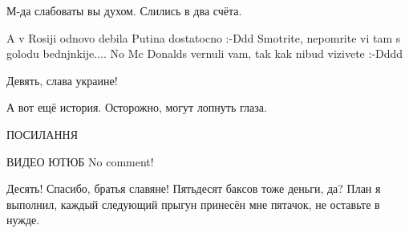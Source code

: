 \begin{itemize}
М-да слабоваты вы духом. Слились в два счёта.


A v Rosiji odnovo debila Putina dostatocno :-Ddd Smotrite, nepomrite vi tam s
golodu bednjnkije.... No Mc Donalds vernuli vam, tak kak nibud vizivete :-Dddd

Девять, слава украине!

А вот ещё история. Осторожно, могут лопнуть глаза.

ПОСИЛАННЯ


ВИДЕО ЮТЮБ
No comment!


Десять! Спасибо, братья славяне! Пятьдесят баксов тоже деньги, да? План я
выполнил, каждый следующий прыгун принесён мне пятачок, не оставьте в нужде.

\end{itemize} %
